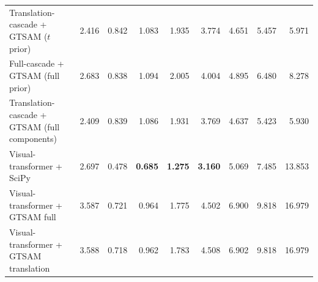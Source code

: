 \documentclass[11pt]{article}
\newcommand{\best}[1]{\textbf{#1}}
\begin{document}
\begin{landscape}
\begin{table}[H]
{\begin{tabular}{lrrrrrrrr}
Translation-cascade + GTSAM ($t$ prior) & 2.416 & 0.842 & 1.083 & 1.935 & 3.774 & 4.651 & 5.457 & 5.971\\
Full-cascade + GTSAM (full prior) & 2.683 & 0.838 & 1.094 & 2.005 & 4.004 & 4.895 & 6.480 & 8.278\\
Translation-cascade + GTSAM (full components) & 2.409 & 0.839 & 1.086 & 1.931 & 3.769 & 4.637 & 5.423 & 5.930\\
Visual-transformer + SciPy & 2.697 & 0.478 & \best{0.685} & \best{1.275} & \best{3.160} & 5.069 & 7.485 & 13.853\\
Visual-transformer + GTSAM full & 3.587 & 0.721 & 0.964 & 1.775 & 4.502 & 6.900 & 9.818 & 16.979\\
Visual-transformer + GTSAM translation & 3.588 & 0.718 & 0.962 & 1.783 & 4.508 & 6.902 & 9.818 & 16.979\\
\bottomrule
\end{tabular}}
\end{table}
\end{landscape}
\end{document}

